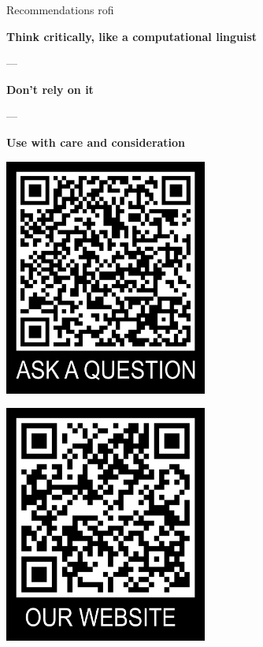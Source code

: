 \documentclass[aspectratio=169,hyperref={unicode}]{beamer}
\begin{document}
\begin{frame}{Recommendations}
	rofi
\end{frame}


\begin{frame}
\begin{center}

\textbf{Think critically, like a computational linguist}

---

\textbf{Don't rely on it}

---

\textbf{Use with care and consideration}


\vspace{1em}

\begin{minipage}{0.4\textwidth}
\centering
    \includegraphics[width=0.5\textwidth]{QRtemplate_5.png}
  \end{minipage}
  \hfill
  \begin{minipage}{0.4\textwidth}
  \centering
    \includegraphics[width=0.5\textwidth]{QRtemplate_4.png}
  \end{minipage}
\end{center}
\end{frame}
\end{document}
